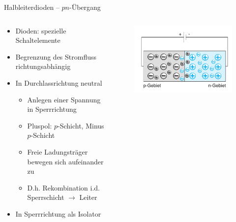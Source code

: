 \documentclass[12pt%
,aspectratio=169%
]{beamer}
\begin{document}
\begin{frame}{Halbleiterdioden -- $pn$-Übergang}
\begin{columns}[T] %
\begin{column}{.48\textwidth}
\begin{itemize}
	\item Dioden: spezielle Schaltelemente
	\item Begrenzung des Stromﬂuss richtungsabhängig
	\item In Durchlassrichtung neutral
	\begin{itemize}
		\item Anlegen einer Spannung in Sperrrichtung
		\item Pluspol: $p$-Schicht, Minus $p$-Schicht
		\item Freie Ladungsträger bewegen sich aufeinander zu
		\item D.h. Rekombination i.d. Sperrschicht $\to$ Leiter
	\end{itemize}
	\item In Sperrrichtung als Isolator
\end{itemize}
\end{column}%
\hfill%
\begin{column}{.48\textwidth}
\begin{figure}
\center
\includegraphics[scale=0.5]{pictures/durchlass}
\end{figure}
\end{column}%
\end{columns}
\end{frame}
\end{document}
